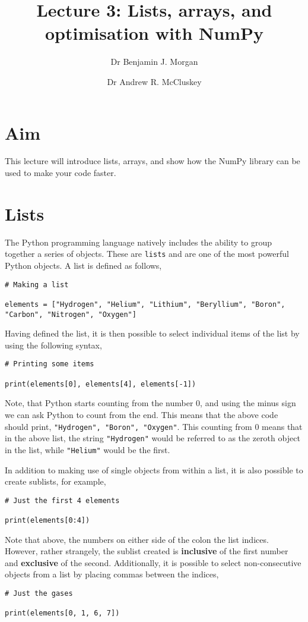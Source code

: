 \documentclass[a4paper]{article}
\title{Lecture 3: Lists, arrays, and optimisation with NumPy}
\author[1]{Dr Benjamin J. Morgan}
\author[1,2]{Dr Andrew R. McCluskey}
\affil[1]{Department of Chemistry, University of Bath, email: b.j.morgan@bath.ac.uk}
\affil[2]{Diamond Light Source, email: andrew.mccluskey@diamond.ac.uk}
\begin{document}
\maketitle

\section*{Aim}
This lecture will introduce lists, arrays, and show how the NumPy library can be used to make your code faster.

\section{Lists}
The Python programming language natively includes the ability to group together a series of objects.
These are \texttt{lists} and are one of the most powerful Python objects.
A list is defined as follows,
\begin{lstlisting}
# Making a list

elements = ["Hydrogen", "Helium", "Lithium", "Beryllium", "Boron", "Carbon", "Nitrogen", "Oxygen"]
\end{lstlisting}
Having defined the list, it is then possible to select individual items of the list by using the following syntax,
\begin{lstlisting}
# Printing some items

print(elements[0], elements[4], elements[-1])
\end{lstlisting}
Note, that Python starts counting from the number $0$, and using the minus sign we can ask Python to count from the end.
This means that the above code should print, \texttt{"Hydrogen", "Boron", "Oxygen"}.
This counting from $0$ means that in the above list, the string \texttt{"Hydrogen"} would be referred to as the zeroth object in the list, while \texttt{"Helium"} would be the first.

In addition to making use of single objects from within a list, it is also possible to create sublists, for example,
\begin{lstlisting}
# Just the first 4 elements

print(elements[0:4])
\end{lstlisting}
Note that above, the numbers on either side of the colon the list indices.
However, rather strangely, the sublist created is \textbf{inclusive} of the first number and \textbf{exclusive} of the second.
Additionally, it is possible to select non-consecutive objects from a list by placing commas between the indices,
\begin{lstlisting}
# Just the gases

print(elements[0, 1, 6, 7])
\end{lstlisting}



%
%
\end{document}
